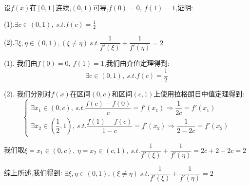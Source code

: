 
\begin{proposition}
	设$f(x)$在$[0,1]$连续,$(0,1)$可导,$f(0)=0,\ f(1)=1$,证明:

	(1).$\exists c\in(0,1),\ s.t. f(c)=\frac{1}{2}$

	(2).$\exists \xi,\eta\in(0,1),(\xi\neq \eta)\ s.t. \dfrac{1}{f'(\xi)}+\dfrac{1}{f'(\eta)}=2$
\end{proposition}
\begin{solution}

	(1). 我们由$f(0)=0,\ f(1)=1$,我们由介值定理得到:
	$$\exists c\in(0,1),\ s.t. f(c)=\dfrac{1}{2}$$

	(2). 我们分别对$f(x)$在区间$(0,c)$和区间$(c,1)$上使用拉格朗日中值定理得到:
	$$\left\lbrace
		\begin{array}{l}
			\exists x_{1}\in(0,c),\ s.t. \dfrac{f(c)-f(0)}{c}=f'(x_{1})\Rightarrow \dfrac{1}{2c}=f'(x_{1}) \\
			\exists x_{2}\in(\dfrac{1}{2},1),\ s.t. \dfrac{f(1)-f(c)}{1-c}=f'(x_{2})\Rightarrow \dfrac{1}{2-2c}=f'(x_{2})
		\end{array}
		\right. $$

	我们取$\xi=x_{1}\in(0,c),\ \eta=x_{2}\in(c,1),\ s.t. \dfrac{1}{f'(\xi)}+\dfrac{1}{f'(\eta)}=2c+2-2c=2$

	综上所述,我们得到: $\exists \xi,\eta\in(0,1),(\xi\neq \eta)\ s.t. \dfrac{1}{f'(\xi)}+\dfrac{1}{f'(\eta)}=2$
\end{solution}


